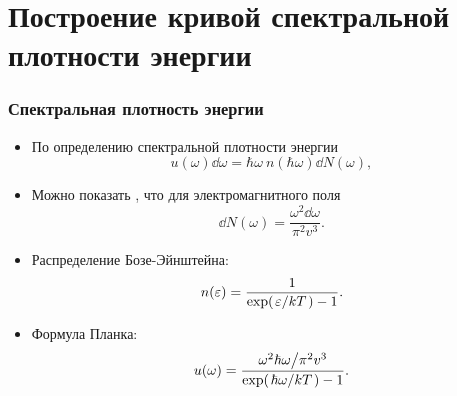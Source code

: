 \documentclass[compress]{beamer}
\begin{document}

    \section[СПЭ]{Построение кривой спектральной плотности энергии}


    \begin{frame}\frametitle{Спектральная плотность энергии}

        \begin{itemize}
            \item По определению спектральной плотности энергии
            \begin{equation}\label{eq:psd}
                u(\omega) \dd{\omega} = \hbar\omega\ n(\hbar\omega) \dd{N(\omega)} ,
            \end{equation}

            \item Можно показать \cite{sivuhin_opt}, что для электромагнитного поля
            \begin{equation}\label{eq:dN_of_eps_cont}
                \dd{N(\omega)} = \frac{\omega^2 \dd{\omega}}{\pi^2 v^3} .
            \end{equation}

            \item Распределение Бозе-Эйнштейна:
            \begin{equation}\label{eq:n_of_eps}
                n(\varepsilon) = \frac{1}{\exp(\flatfrac{\varepsilon}{kT}) - 1} .
            \end{equation}

            \item Формула Планка:
            \begin{equation}
                u(\omega) = \frac{
                        \flatfrac{\omega^2 \hbar\omega}{\pi^2 v^3}
                }{\exp(\flatfrac{\hbar\omega}{kT}) - 1} .
            \end{equation}

        \end{itemize}

    \end{frame}
\end{document}
